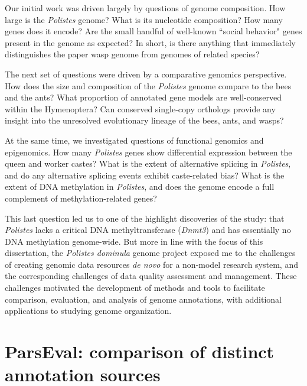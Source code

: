 Our initial work was driven largely by questions of genome composition.
How large is the \textit{Polistes} genome?
What is its nucleotide composition?
How many genes does it encode?
Are the small handful of well-known ``social behavior" genes present in the genome as expected?
In short, is there anything that immediately distinguishes the paper wasp genome from genomes of related species?


The next set of questions were driven by a comparative genomics perspective.
How does the size and composition of the \textit{Polistes} genome compare to the bees and the ants?
What proportion of annotated gene models are well-conserved within the Hymenoptera?
Can conserved single-copy orthologs provide any insight into the unresolved evolutionary lineage of the bees, ants, and wasps?

At the same time, we investigated questions of functional genomics and epigenomics.
How many \textit{Polistes} genes show differential expression between the queen and worker castes?
What is the extent of alternative splicing in \textit{Polistes}, and do any alternative splicing events exhibit caste-related bias?
What is the extent of DNA methylation in \textit{Polistes}, and does the genome encode a full complement of methylation-related genes?

This last question led us to one of the highlight discoveries of the study: that \textit{Polistes} lacks a critical DNA methyltransferase (\textit{Dnmt3}) and has essentially no DNA methylation genome-wide.
But more in line with the focus of this dissertation, the \textit{Polistes dominula} genome project exposed me to the challenges of creating genomic data resources \textit{de novo} for a non-model research system, and the corresponding challenges of data quality assessment and management.
These challenges motivated the development of methods and tools to facilitate comparison, evaluation, and analysis of genome annotations, with additional applications to studying genome organization.

\section{ParsEval: comparison of distinct annotation sources}

